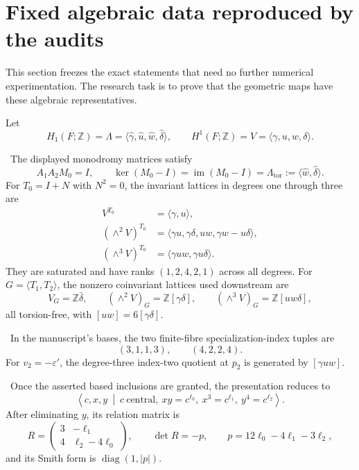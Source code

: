 \section{Fixed algebraic data reproduced by the audits}

This section freezes the exact statements that need no further numerical experimentation. The research task is to prove that the geometric maps have these algebraic representatives.

Let
\[
H_1(F;\mathbb Z)=\Lambda
=\langle\widehat\gamma,\widehat u,\widehat w,\widehat\delta\rangle,
\qquad
H^1(F;\mathbb Z)=V
=\langle\gamma,u,w,\delta\rangle.
\]

\begin{proposition}
\Verified\ The displayed monodromy matrices satisfy
\[
A_1A_2M_0=I,
\qquad
\ker(M_0-I)=\operatorname{im}(M_0-I)
=\Lambda_{\mathrm{tor}}:=\langle\widehat w,\widehat\delta\rangle.
\]
For $T_0=I+N$ with $N^2=0$, the invariant lattices in degrees one through three are
\begin{align*}
V^{T_0}&=\langle\gamma,u\rangle,\\
(\wedge^2V)^{T_0}
&=\langle\gamma u,\gamma\delta,uw,\gamma w-u\delta\rangle,\\
(\wedge^3V)^{T_0}
&=\langle\gamma uw,\gamma u\delta\rangle.
\end{align*}
They are saturated and have ranks $(1,2,4,2,1)$ across all degrees. For $G=\langle T_1,T_2\rangle$, the nonzero coinvariant lattices used downstream are
\[
V_G=\mathbb Z\bar\delta,\qquad
(\wedge^2V)_G=\mathbb Z[\gamma\delta],\qquad
(\wedge^3V)_G=\mathbb Z[uw\delta],
\]
all torsion-free, with $[uw]=6[\gamma\delta]$.
\end{proposition}

\begin{proposition}
\Verified\ In the manuscript's bases, the two finite-fibre specialization-index tuples are
\[
(3,1,1,3),\qquad (4,2,2,4).
\]
For $v_2=-\varepsilon'$, the degree-three index-two quotient at $p_2$ is generated by $[\gamma uw]$.
\end{proposition}

\begin{proposition}
\Verified\ Once the asserted based inclusions are granted, the presentation reduces to
\[
\left\langle c,x,y\ \middle|\ c\ \text{central},\ xy=c^{\ell_0},\
x^3=c^{\ell_1},\ y^4=c^{\ell_2}\right\rangle.
\]
After eliminating $y$, its relation matrix is
\[
R=\begin{pmatrix}3&-\ell_1\\4&\ell_2-4\ell_0\end{pmatrix},
\qquad
\det R=-p,
\qquad
p=12\ell_0-4\ell_1-3\ell_2,
\]
and its Smith form is $\operatorname{diag}(1,|p|)$.
\end{proposition}

